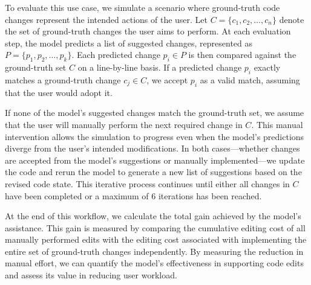 To evaluate this use case, we simulate a scenario where ground-truth code changes represent the intended actions of the user. Let \( C = \{c_1, c_2, \dots, c_n\} \) denote the set of ground-truth changes the user aims to perform. At each evaluation step, the model predicts a list of suggested changes, represented as \( P = \{p_1, p_2, \dots, p_k\} \). Each predicted change \( p_i \in P \) is then compared against the ground-truth set \( C \) on a line-by-line basis. If a predicted change \( p_i \) exactly matches a ground-truth change \( c_j \in C \), we accept \( p_i \) as a valid match, assuming that the user would adopt it.

If none of the model's suggested changes match the ground-truth set, we assume that the user will manually perform the next required change in \( C \). This manual intervention allows the simulation to progress even when the model's predictions diverge from the user's intended modifications. In both cases—whether changes are accepted from the model's suggestions or manually implemented—we update the code and rerun the model to generate a new list of suggestions based on the revised code state. This iterative process continues until either all changes in \( C \) have been completed or a maximum of 6 iterations has been reached.

At the end of this workflow, we calculate the total gain achieved by the model's assistance. This gain is measured by comparing the cumulative editing cost of all manually performed edits with the editing cost associated with implementing the entire set of ground-truth changes independently. By measuring the reduction in manual effort, we can quantify the model's effectiveness in supporting code edits and assess its value in reducing user workload.

